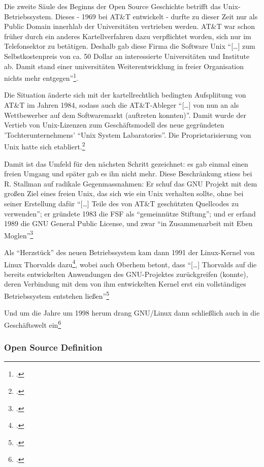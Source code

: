 \documentclass[DIV=calc,BCOR=5mm,11pt,headings=small,oneside,abstract=true, toc=bib]{scrartcl}
\begin{document}
Die zweite Säule des Beginns der Open Source Geschichte betrifft das
Unix-Betriebssystem. Dieses - 1969 bei AT\&T entwickelt - durfte zu dieser Zeit
nur als Public Domain innerhlab der Universitäten vertrieben werden. AT\&T war
schon früher durch ein anderes Kartellverfahren dazu verpflichtet worden, sich
nur im Telefonsektor zu betätigen. Deshalb gab diese Firma die Software Unix
\enquote{[\ldots] zum Selbstkostenpreis von ca. 50 Dollar an interessierte
Universitäten und Institute ab. Damit stand einer universitäten
Weiterentwicklung in freier Organisation nichts mehr
entgegen}\footcite[vgl.][20]{Oberhem2008a}.

Die Situation änderte sich mit der kartellrechtlich bedingten Aufspliitung von
AT\&T im Jahren 1984, sodass auch die AT\&T-Ableger \enquote{[\ldots] von nun an
als Wettbewerber auf dem Softwaremarkt (auftreten konnten)}. Damit wurde
der Vertieb von Unix-Lizenzen zum Geschäftsmodell des neue gegründeten
'Tochterunternehmens' \enquote{Unix System Labaratories}. Die
Proprietarisierung von Unix hatte sich
etabliert.\footcite[vgl.][21]{Oberhem2008a}

Damit ist das Umfeld für den nächsten Schritt gezeichnet: es gab einmal einen
freien Umgang und später gab es ihn nicht mehr. Diese Beschränkung stiess bei R.
Stallman auf radikale Gegenmassnahmen: Er schuf das GNU Projekt mit dem großen
Ziel eines freien Unix, das sich wie ein Unix verhalten sollte, ohne bei seiner
Erstellung dafür \enquote{[\ldots] Teile des von AT\&T geschützten
Quellcodes zu verwenden}; er gründete 1983 die FSF als \enquote{gemeinnütze
Stiftung}; und er erfand 1989 die GNU General Public License, und zwar
\enquote{in Zusammenarbeit mit Eben Moglen}\footcite[vgl.][22]{Oberhem2008a}

Als \enquote{Herzstück} des neuen Betriebssystem kam dann 1991 der
Linux-Kernel von Linux Thorvalds dazu\footcite[vgl.][23]{Oberhem2008a}, wobei
auch Oberhem betont, dass \enquote{[\ldots] Thorvalds auf die bereits
entwickelten Anwendungen des GNU-Projektes zurückgreifen (konnte), deren
Verbindung mit dem von ihm entwickelten Kernel erst ein vollständiges
Betriebssystem entstehen ließen}\footcite[vgl.][24]{Oberhem2008a}

Und um die Jahre um 1998 herum drang GNU/Linux dann schließlich auch in die
Geschäftswelt ein\footcite[vgl.][25]{Oberhem2008a}

\subsubsection{Open Source Definition}
\end{document}
